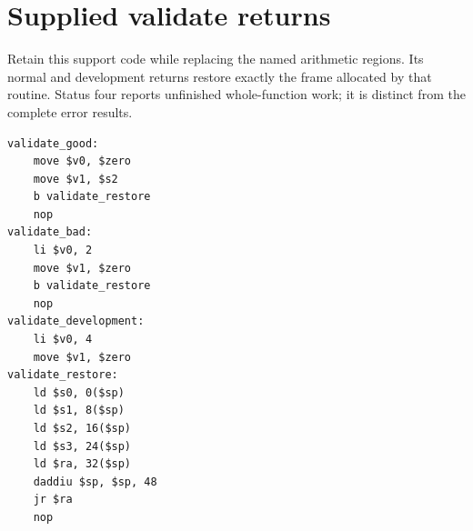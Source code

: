 \section{Supplied validate returns}
Retain this support code while replacing the named arithmetic regions. Its normal and development returns restore exactly the frame allocated by that routine. Status four reports unfinished whole-function work; it is distinct from the complete error results.

\begin{verbatim}
validate_good:
    move $v0, $zero
    move $v1, $s2
    b validate_restore
    nop
validate_bad:
    li $v0, 2
    move $v1, $zero
    b validate_restore
    nop
validate_development:
    li $v0, 4
    move $v1, $zero
validate_restore:
    ld $s0, 0($sp)
    ld $s1, 8($sp)
    ld $s2, 16($sp)
    ld $s3, 24($sp)
    ld $ra, 32($sp)
    daddiu $sp, $sp, 48
    jr $ra
    nop
\end{verbatim}
